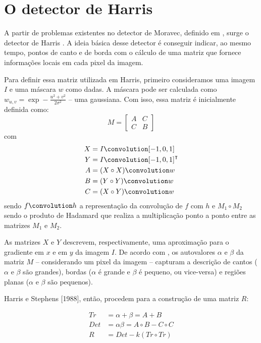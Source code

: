 \documentclass[12pt]{article}
\begin{document}
\section{O detector de Harris}

A partir de  problemas existentes no detector de  Moravec, definido em
\cite{moravec},  surge o  detector  de Harris  \cite{harris}. A  ideia
básica desse detector  é conseguir indicar, ao mesmo  tempo, pontos de
canto e de  borda com o cálculo de uma  matriz que fornece informações
locais em cada pixel da imagem.

Para definir essa matriz utilizada em Harris, primeiro consideramos uma
imagem $I$ e uma máscara $w$  como dadas. A máscara pode ser calculada
como   $w_{u,v}  =   \exp   -\frac{u^2  +   v^2}{2\sigma^2}$  --   uma
gaussiana. Com isso, essa matriz é inicialmente definida como:
\[
M = \begin{bmatrix}
  A & C \\
  C & B
\end{bmatrix}
\]
com
\begin{align*}
  X & = I \convolution [-1, 0, 1] \\
  Y & = I \convolution [-1, 0, 1]^\intercal \\
  A & = (X \circ X) \convolution w \\
  B & = (Y \circ Y) \convolution w \\
  C & = (X \circ Y) \convolution w
\end{align*}
sendo $f \convolution h$ a  representação da convolução de $f$ com $h$
e  $M_1  \circ  M_2$  sendo  o  produto  de  Hadamard  que  realiza  a
multiplicação ponto a ponto entre as matrizes $M_1$ e $M_2$.

As matrizes $X$ e $Y$ descrevem, respectivamente, uma aproximação para
o  gradiente  em  $x$  e  em   $y$  da  imagem  $I$.   De  acordo  com
\cite{harris},  os autovalores  $\alpha$ e  $\beta$ da  matriz  $M$ --
considerando  um pixel  da imagem  -- capturam  a descrição  de cantos
($\alpha$ e $\beta$ são grandes),  bordas ($\alpha$ é grande e $\beta$
é pequeno,  ou vice-versa)  e regiões planas  ($\alpha$ e  $\beta$ são
pequenos).

Harris e  Stephens [1988],  então, procedem para  a construção  de uma
matriz $R$:  %

\begin{align}
  Tr & = \alpha + \beta = A + B \nonumber \\
  Det & = \alpha \beta = A \circ B - C \circ C \nonumber \\
  R & = Det - k (Tr \circ Tr) \label{REq}
\end{align}
\end{document}
